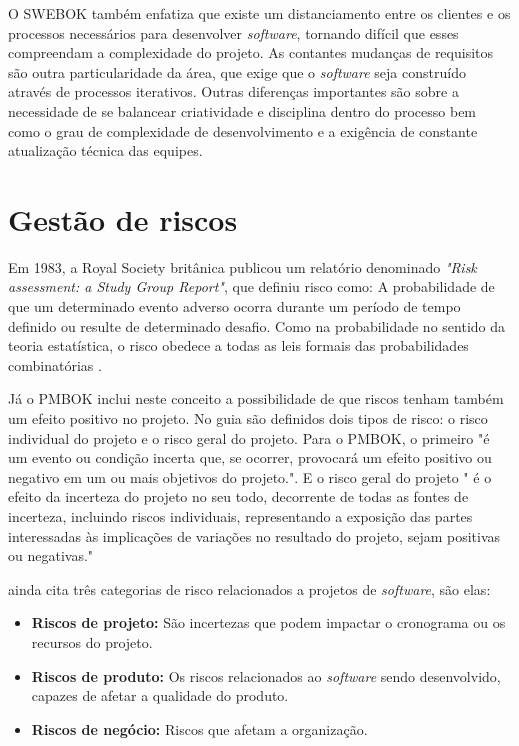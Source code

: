 \documentclass[
    12pt,       %
    openright,      %
    twoside,      %
    a4paper,      %
    english,      %
    french,       %
    spanish,      %
    brazil,       %
    ]{abntex2}
\begin{document}
O SWEBOK \cite{SWEBOK:2014} também enfatiza que existe um distanciamento entre os clientes e os processos necessários para desenvolver \textit{software}, tornando difícil que esses compreendam a complexidade do projeto. As contantes mudanças de requisitos são outra particularidade da área, que exige que o \textit{software} seja construído através de processos iterativos. Outras diferenças importantes são sobre a necessidade de se balancear criatividade e disciplina dentro do processo bem como o grau de complexidade de desenvolvimento e a exigência de constante atualização técnica das equipes.

\section{Gestão de riscos}

Em 1983, a Royal Society britânica publicou um relatório denominado \textit{"Risk assessment: a Study Group Report"}, que definiu risco como: A probabilidade de que um determinado evento adverso ocorra durante um período de tempo definido ou resulte de determinado desafio. Como na probabilidade no sentido da teoria estatística, o risco obedece a todas as leis formais das probabilidades combinatórias \cite{ADAMS:1995}. 

Já o PMBOK \cite{PMBOK:2017} inclui neste conceito a possibilidade de que riscos tenham também um efeito positivo no projeto. No guia são definidos dois tipos de risco: o risco individual do projeto e o risco geral do projeto. Para o PMBOK, o primeiro "é um evento ou condição incerta que, se ocorrer, provocará um efeito positivo ou
negativo em um ou mais objetivos do projeto.". E o risco geral do projeto " é o efeito da incerteza do projeto no seu todo, decorrente de todas as fontes de incerteza, incluindo riscos individuais, representando a exposição das partes interessadas às implicações de variações no resultado do projeto, sejam positivas ou negativas."

 ainda cita três categorias de risco relacionados a projetos de \textit{software}, são elas:

\begin{itemize}
    \item\textbf{Riscos de projeto:} São incertezas que podem impactar o cronograma ou os recursos do projeto.  
    \item\textbf{Riscos de produto:} Os riscos relacionados ao \textit{software} sendo desenvolvido, capazes de afetar a qualidade do produto.
    \item\textbf{Riscos de negócio:} Riscos que afetam a organização.
\end{itemize}
\end{document}
